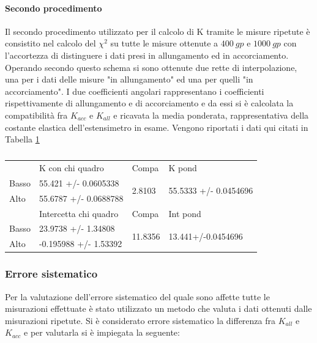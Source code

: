 \documentclass[a4paper,11pt,oneside]{article}
\begin{document}
\paragraph{Secondo procedimento}
Il secondo procedimento utilizzato per il calcolo di K tramite le misure ripetute è consistito nel calcolo del $\chi^2$ su tutte le misure ottenute a $\SI{400}{gp}$ e $\SI{1000}{gp}$ con l'accortezza di distinguere i dati presi in allungamento ed in accorciamento. Operando secondo questo schema si sono ottenute due rette di interpolazione, una per i dati delle misure "in allungamento" ed una per quelli "in accorciamento". I due coefficienti angolari rappresentano i coefficienti rispettivamente di allungamento e di accorciamento e da essi si è calcolata la compatibilità fra ${K}_{acc}$ e ${K}_{all}$ e ricavata la media ponderata, rappresentativa della costante elastica dell'estensimetro in esame. Vengono riportati i dati qui citati in Tabella \ref{tab:2ac_2met}%

\begin{table}[]
\caption{}
\label{tab:2ac_2met}
\begin{tabular}{llll}
      & K con chi quadro      & Compa                    & K pond                                 \\
Basso & 55.421 +/- 0.0605338  & \multirow{2}{*}{2.8103}  & \multirow{2}{*}{55.5333 +/- 0.0454696} \\
Alto  & 55.6787 +/- 0.0688788 &                          &                                        \\
      & Intercetta chi quadro & Compa                    & Int pond                               \\
Basso & 23.9738 +/- 1.34808   & \multirow{2}{*}{11.8356} & \multirow{2}{*}{13.441+/-0.0454696}    \\
Alto  & -0.195988 +/- 1.53392 &                          &                                       
\end{tabular}
\end{table}





\subsubsection*{Errore sistematico}\label{par:errore_desalva}
Per la valutazione dell'errore sistematico del quale sono affette tutte le misurazioni effettuate è stato utilizzato un metodo che valuta i dati ottenuti dalle misurazioni ripetute. Si è considerato errore sistematico la differenza fra $K_{all}$ e $K_{acc}$ e per valutarla si è impiegata la seguente:
\end{document}
